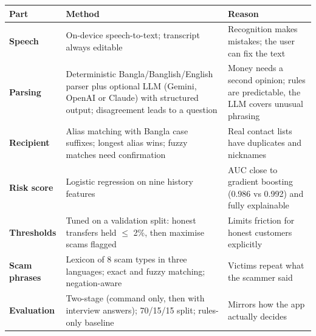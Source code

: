 \documentclass[11pt,a4paper]{article}
\begin{document}
\begin{tabularx}{\textwidth}{@{}>{\raggedright\arraybackslash\bfseries}p{24mm} >{\raggedright\arraybackslash}X >{\raggedright\arraybackslash}p{50mm}@{}}
\toprule
\textnormal{\sffamily\small Part} & \sffamily\small Method & \sffamily\small Reason\\
\midrule
Speech & On-device speech-to-text; transcript always editable & Recognition makes mistakes; the user can fix the text\\
Parsing & Deterministic Bangla/Banglish/English parser plus optional LLM (Gemini, OpenAI or Claude) with structured output; disagreement leads to a question & Money needs a second opinion; rules are predictable, the LLM covers unusual phrasing\\
Recipient & Alias matching with Bangla case suffixes; longest alias wins; fuzzy matches need confirmation & Real contact lists have duplicates and nicknames\\
Risk score & Logistic regression on nine history features & AUC close to gradient boosting (0.986 vs 0.992) and fully explainable\\
Thresholds & Tuned on a validation split: honest transfers held $\le$ 2\%, then maximise scams flagged & Limits friction for honest customers explicitly\\
Scam phrases & Lexicon of 8 scam types in three languages; exact and fuzzy matching; negation-aware & Victims repeat what the scammer said\\
Evaluation & Two-stage (command only, then with interview answers); 70/15/15 split; rules-only baseline & Mirrors how the app actually decides\\
\bottomrule
\end{tabularx}
\end{document}
